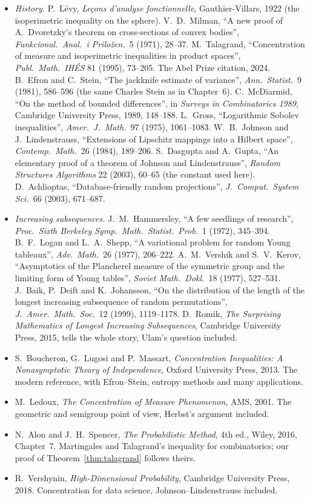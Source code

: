 \begin{itemize}
\item \emph{History.} P.~L\'evy, \emph{Le\c cons d'analyse fonctionnelle}, Gauthier-Villars, 1922 (the isoperimetric inequality on the sphere). V.~D.~Milman, ``A new proof of
A.~Dvoretzky's theorem on cross-sections of convex bodies'', \emph{Funkcional.\ Anal.\ i Prilo\v zen.}\ 5 (1971), 28--37. M.~Talagrand, ``Concentration of measure and isoperimetric
inequalities in product spaces'', \emph{Publ.\ Math.\ IH\'ES} 81 (1995), 73--205. The Abel Prize citation, 2024. B.~Efron and C.~Stein, ``The jackknife estimate of variance'',
\emph{Ann.\ Statist.}\ 9 (1981), 586--596 (the same Charles Stein as in Chapter~6). C.~McDiarmid, ``On the method of bounded differences'', in \emph{Surveys in Combinatorics 1989},
Cambridge University Press, 1989, 148--188. L.~Gross, ``Logarithmic Sobolev inequalities'', \emph{Amer.\ J.\ Math.}\ 97 (1975), 1061--1083. W.~B.~Johnson and J.~Lindenstrauss,
``Extensions of Lipschitz mappings into a Hilbert space'', \emph{Contemp.\ Math.}\ 26 (1984), 189--206. S.~Dasgupta and A.~Gupta, ``An elementary proof of a theorem of Johnson
and Lindenstrauss'', \emph{Random Structures Algorithms} 22 (2003), 60--65 (the constant used here). D.~Achlioptas, ``Database-friendly random projections'', \emph{J.\ Comput.\ System Sci.}\
66 (2003), 671--687.
\item \emph{Increasing subsequences.} J.~M.~Hammersley, ``A few seedlings of research'', \emph{Proc.\ Sixth Berkeley Symp.\ Math.\ Statist.\ Prob.}\ 1 (1972), 345--394. B.~F.~Logan and L.~A.~Shepp,
``A variational problem for random Young tableaux'', \emph{Adv.\ Math.}\ 26 (1977), 206--222. A.~M.~Vershik and S.~V.~Kerov, ``Asymptotics of the Plancherel measure of the symmetric group
and the limiting form of Young tables'', \emph{Soviet Math.\ Dokl.}\ 18 (1977), 527--531. J.~Baik, P.~Deift and K.~Johansson, ``On the distribution of the length of the longest increasing
subsequence of random permutations'', \emph{J.\ Amer.\ Math.\ Soc.}\ 12 (1999), 1119--1178. D.~Romik, \emph{The Surprising Mathematics of Longest Increasing Subsequences}, Cambridge
University Press, 2015, tells the whole story, Ulam's question included.
\item S.~Boucheron, G.~Lugosi and P.~Massart, \emph{Concentration Inequalities: A Nonasymptotic Theory of Independence}, Oxford University Press, 2013. The modern reference, with
Efron--Stein, entropy methods and many applications.
\item M.~Ledoux, \emph{The Concentration of Measure Phenomenon}, AMS, 2001. The geometric and semigroup point of view, Herbst's argument included.
\item N.~Alon and J.~H.~Spencer, \emph{The Probabilistic Method}, 4th ed., Wiley, 2016, Chapter~7. Martingales and Talagrand's inequality for combinatorics; our proof of
Theorem~\ref{thm:talagrand} follows theirs.
\item R.~Vershynin, \emph{High-Dimensional Probability}, Cambridge University Press, 2018. Concentration for data science, Johnson--Lindenstrauss included.
\end{itemize}
